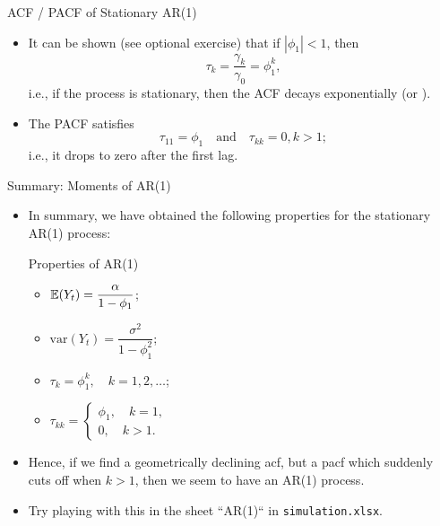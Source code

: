 \begin{frame}{ACF / PACF of Stationary AR(1)}
\begin{itemize}
\item It can be shown (see optional exercise) that if $|\phi_1|<1$, then
\begin{equation*}
\tau_k = \frac{\gamma_k}{\gamma_0} = \phi_1 ^k,
\end{equation*}
i.e., if the process is stationary, then the ACF decays exponentially (or ).
\item The PACF satisfies
\[
\tau_{11} = \phi_1 \quad\mbox{and}\quad \tau_{kk} = 0, k>1;
\]
i.e., it drops to zero after the first lag.
\end{itemize}
\end{frame}
\begin{frame}{Summary: Moments of AR(1)}
\begin{itemize}

\item In summary, we have
obtained the following properties for the stationary AR(1) process:
\begin{block}{Properties of AR(1)}
\begin{itemize}
\item ${\mathbb E}(Y_t) =\dfrac \alpha {1-\phi_1 }$;

\item $\mathrm{var}(Y_t) = \dfrac{\sigma ^2}{1-\phi_1 ^2}$;

\item $\tau _k =\phi_1 ^k,\quad k=1,2,\ldots$;

\item $\tau _{kk} =\left\{
\begin{array}{c}
\phi_1 ,\quad k=1, \\
0,\quad k>1.
\end{array}
\right. $
\end{itemize}
\end{block}
\item Hence, if we find a geometrically declining acf, but a pacf which suddenly
cuts off when $k>1$, then we seem to have an AR(1) process.
\item Try playing with this in the sheet ``AR(1)`` in \texttt{simulation.xlsx}.
\end{itemize}
\end{frame}

